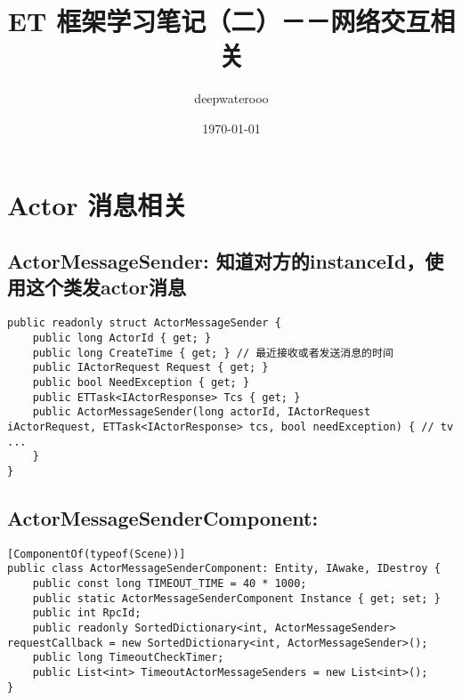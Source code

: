 \documentclass[9pt, b5paper]{article}
\author{deepwaterooo}
\date{\today}
\title{ET 框架学习笔记（二）－－网络交互相关}
\begin{document}
\maketitle
\tableofcontents


\section{Actor 消息相关}
\label{sec-1}
\subsection{ActorMessageSender: 知道对方的instanceId，使用这个类发actor消息}
\label{sec-1-1}
\begin{verbatim}
public readonly struct ActorMessageSender {
    public long ActorId { get; }
    public long CreateTime { get; } // 最近接收或者发送消息的时间
    public IActorRequest Request { get; }
    public bool NeedException { get; }
    public ETTask<IActorResponse> Tcs { get; }
    public ActorMessageSender(long actorId, IActorRequest iActorRequest, ETTask<IActorResponse> tcs, bool needException) { // tv ... 
    }
}
\end{verbatim}
\subsection{ActorMessageSenderComponent:}
\label{sec-1-2}
\begin{verbatim}
[ComponentOf(typeof(Scene))]
public class ActorMessageSenderComponent: Entity, IAwake, IDestroy {
    public const long TIMEOUT_TIME = 40 * 1000;
    public static ActorMessageSenderComponent Instance { get; set; }
    public int RpcId;
    public readonly SortedDictionary<int, ActorMessageSender> requestCallback = new SortedDictionary<int, ActorMessageSender>();
    public long TimeoutCheckTimer;
    public List<int> TimeoutActorMessageSenders = new List<int>();
}
\end{verbatim}
\end{document}

